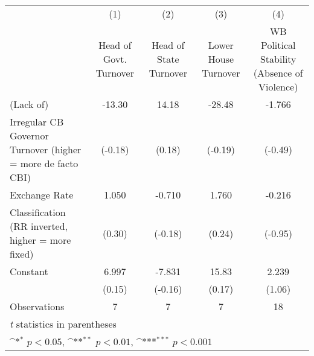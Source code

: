 {
\def\sym#1{\ifmmode^{#1}\else\(^{#1}\)\fi}
\begin{tabular}{l*{4}{c}}
\toprule
                &\multicolumn{1}{c}{(1)}&\multicolumn{1}{c}{(2)}&\multicolumn{1}{c}{(3)}&\multicolumn{1}{c}{(4)}\\
                &\multicolumn{1}{c}{Head of Govt. Turnover}&\multicolumn{1}{c}{Head of State Turnover}&\multicolumn{1}{c}{Lower House Turnover}&\multicolumn{1}{c}{WB Political Stability (Absence of Violence)}\\
\midrule
(Lack of)       &   -13.30         &    14.18         &   -28.48         &   -1.766         \\
Irregular CB Governor Turnover (higher = more de facto CBI)&  (-0.18)         &   (0.18)         &  (-0.19)         &  (-0.49)         \\
\addlinespace
Exchange Rate   &    1.050         &   -0.710         &    1.760         &   -0.216         \\
Classification (RR inverted, higher = more fixed)&   (0.30)         &  (-0.18)         &   (0.24)         &  (-0.95)         \\
\addlinespace
Constant        &    6.997         &   -7.831         &    15.83         &    2.239         \\
                &   (0.15)         &  (-0.16)         &   (0.17)         &   (1.06)         \\
\midrule
Observations    &        7         &        7         &        7         &       18         \\
\bottomrule
\multicolumn{5}{l}{\footnotesize \textit{t} statistics in parentheses}\\
\multicolumn{5}{l}{\footnotesize \sym{*} \(p<0.05\), \sym{**} \(p<0.01\), \sym{***} \(p<0.001\)}\\
\end{tabular}
}
